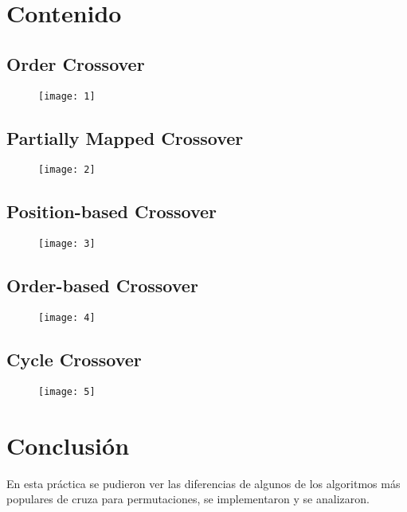 \documentclass{article}
\begin{document}
\section{Contenido}
\subsection{Order Crossover}
\begin{figure}[h!]
	\centering
	\texttt{[image: 1]}
\end{figure}
\newpage
\subsection{Partially Mapped Crossover}
\begin{figure}[h!]
	\centering
	\texttt{[image: 2]}
\end{figure}
\newpage
\subsection{Position-based Crossover}
\begin{figure}[h!]
	\centering
	\texttt{[image: 3]}
\end{figure}
\newpage
\subsection{Order-based Crossover}
\begin{figure}[h!]
	\centering
	\texttt{[image: 4]}
\end{figure}
\subsection{Cycle Crossover}
\begin{figure}[h!]
	\centering
	\texttt{[image: 5]}
\end{figure}
\section{Conclusión}
En esta práctica se pudieron ver las diferencias de algunos de los algoritmos más populares de cruza para permutaciones, se implementaron y se analizaron.
\end{document}
